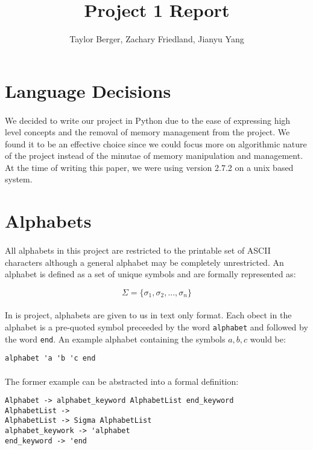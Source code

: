 \documentclass{article}
\begin{document}
\title{Project 1 Report}
\author{Taylor Berger, Zachary Friedland, Jianyu Yang}
\maketitle

\section{Language Decisions}
\paragraph{} We decided to write our project in Python due to the ease of
expressing high level concepts and the removal of memory management
from the project. We found it to be an effective choice since we could
focus more on algorithmic nature of the project instead of the minutae
of memory manipulation and management. At the time of writing this
paper, we were using version 2.7.2 on a unix based system.

\section{Alphabets}
\label{sec:alphabet}
\paragraph{} All alphabets in this project are restricted to the printable set of
ASCII characters although a general alphabet may be completely
unrestricted. An alphabet is defined as a set of unique symbols and are formally represented as:

\[\Sigma = \{\sigma_1, \sigma_2, ... ,\sigma_n\}\]

\paragraph{} In is project, alphabets are given to us in text only format.
 Each obect in the alphabet is a pre-quoted symbol preceeded by the
 word \verb|alphabet| and followed by the word \verb|end|. An example
 alphabet containing the symbols $a,b,c$ would be:

\begin{verbatim}
alphabet 'a 'b 'c end
\end{verbatim}

\paragraph{} The former example can be abstracted into a formal definition:
\begin{verbatim}
Alphabet -> alphabet_keyword AlphabetList end_keyword
AlphabetList -> 
AlphabetList -> Sigma AlphabetList
alphabet_keywork -> 'alphabet
end_keyword -> 'end
\end{verbatim}
\end{document}
